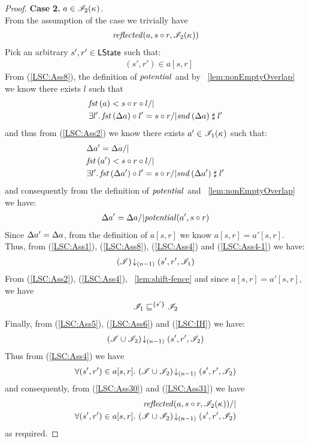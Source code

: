 \begin{lemma}
\begin{proof}
\noindent\textbf{Case 2. } $a \in \mathscr{I}_2(\kappa_{})$.\\
From the assumption of the case we trivially have
\begin{align}
	\mathit{reflected}(a, s \circ r, \mathscr{I}_2(\kappa_{}))
	\label{LSC:Ass30}
\end{align}
%
Pick an arbitrary $s', r' \in \textsf{LState}$ such that:
\begin{align}
	&(s', r') \in a[s, r] \label{LSC:Ass4}
\end{align}
From (\ref{LSC:Ass8}), the definition of $\mathit{potential}$ and by \lem~\ref{lem:nonEmptyOverlap} we know there exists $l$ such that 
%
\begin{align*}
	& \fst{a} < s \composeL r \composeL l /| \null\\
	& \exsts{l'} \fst{\updateFP{a}} \composeL l' = s \composeL r /| \snd{\updateFP{a}} \compatible l'
\end{align*}
%
and thus from (\ref{LSC:Ass2}) we know there exists $a' \in \mathscr{I}_1(\kappa_{})$ such that: 
%
\begin{align*}
	& \updateFP{a'} = \updateFP{a} /|\\
	& \fst{a'} < s \composeL r \composeL l /| \null\\
	& \exsts{l'} \fst{\updateFP{a'}} \composeL l' = s \composeL r /| \snd{\updateFP{a'}} \compatible l'
\end{align*}
%
and consequently from the definition of $\mathit{potential}$ and \lem~\ref{lem:nonEmptyOverlap} we have: 
%
\begin{align}
	\Delta {a'} = \Delta {a} /| \mathit{potential}(a', s \circ r) \label{LSC:Ass4-1}
\end{align}
Since $\Delta {a'} = \Delta {a}$, from the definition of $a[s, r]$ we know $a[s, r] = a'[s, r]$. Thus, from (\ref{LSC:Ass1}), (\ref{LSC:Ass8}), (\ref{LSC:Ass4}) and (\ref{LSC:Ass4-1}) we have:
%
\begin{align}
	\left(\mathscr{I}\right) \!\downarrow_{(n-1)} \left(s', r', \mathscr{I}_1\right) \label{LSC:Ass5}
\end{align}
%
From (\ref{LSC:Ass2}), (\ref{LSC:Ass4}), \lem~\ref{lem:shift-fence} and since $a[s, r] = a'[s, r]$, we have
%
\begin{align}
	\mathscr{I}_1 \sqsubseteq^{\{s'\}} \mathscr{I}_2 \label{LSC:Ass6}
\end{align}
%
Finally, from (\ref{LSC:Ass5}), (\ref{LSC:Ass6}) and (\ref{LSC:IH}) we have:
%
\begin{align*}
	\left(\mathscr{I} \cup \mathscr{I}_2\right) \!\downarrow_{(n-1)} \left(s', r', \mathscr{I}_2\right)
\end{align*}
%
Thus from (\ref{LSC:Ass4}) we have
%
\begin{align}
	\forall (s', r') \in a[s, r].\, \left(\mathscr{I} \cup \mathscr{I}_2\right) \!\downarrow_{(n-1)} \left(s', r', \mathscr{I}_2\right)
	\label{LSC:Ass31}
\end{align}
%
and consequently, from (\ref{LSC:Ass30}) and (\ref{LSC:Ass31}) we have
%
\begin{align}
	\mathit{reflected}(a, s \circ r, \mathscr{I}_2(\kappa_{})) /| \\
	\forall (s', r') \in a[s, r].\, \left(\mathscr{I} \cup \mathscr{I}_2\right) \!\downarrow_{(n-1)} \left(s', r', \mathscr{I}_2\right)
\end{align}
%
as required.
%
%
%
%



\end{proof}
\end{lemma}
